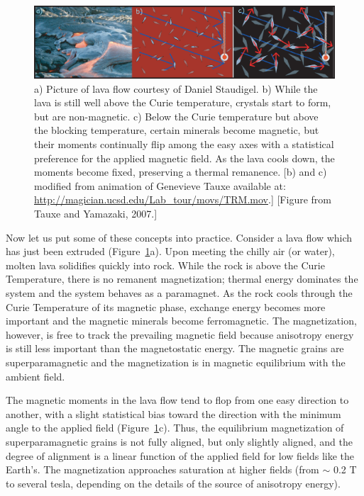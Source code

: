 \begin{figure}[h!tb]
\centering  \includegraphics[width=14 cm]{EPSfiles/lava.eps}
\caption{a) 
Picture of lava flow courtesy of Daniel Staudigel.  b) While the lava is still well above the Curie temperature, crystals start to form, but are non-magnetic.  c) Below the Curie temperature but above the blocking temperature,  certain minerals become magnetic, but their moments continually flip among the easy axes with a statistical preference for the applied magnetic field.  As the lava cools down, the moments become fixed, preserving a thermal remanence.  [b) and c) modified from animation of Genevieve Tauxe available at:  \newline \url{http://magician.ucsd.edu/Lab_tour/movs/TRM.mov}.] [Figure from Tauxe and Yamazaki, 2007.]
 }
\label{fig:lava}
\end{figure}


Now let us put some of these concepts into practice.  
Consider a lava flow which has just been extruded (Figure~\ref{fig:lava}a).
Upon meeting the chilly air (or water),  molten lava  solidifies quickly into rock.  While the rock is above the 
Curie
Temperature,  there is no  remanent magnetization; 
thermal energy dominates the
system and the system behaves as a paramagnet.  As the rock cools through the Curie Temperature of its magnetic phase,
exchange energy becomes more important and the magnetic minerals  become ferromagnetic.    The magnetization, however, is free to track the
prevailing magnetic field  because 
anisotropy energy is still  less important
than the magnetostatic energy.  The magnetic grains are  
superparamagnetic and the magnetization is in 
magnetic equilibrium with the ambient field.


The magnetic moments in the lava flow  tend to flop from one  easy
direction to another,
with a slight statistical bias toward the direction with 
the minimum angle to the applied field (Figure~\ref{fig:lava}c).  Thus, the 
equilibrium magnetization of superparamagnetic grains is not fully
aligned,   but only slightly aligned, and the degree of alignment is a linear function of the applied field for low fields like the Earth's.  The magnetization approaches saturation at higher
fields (from $\sim$ 0.2 T to several tesla, depending on the details of
the source of anisotropy energy).  




